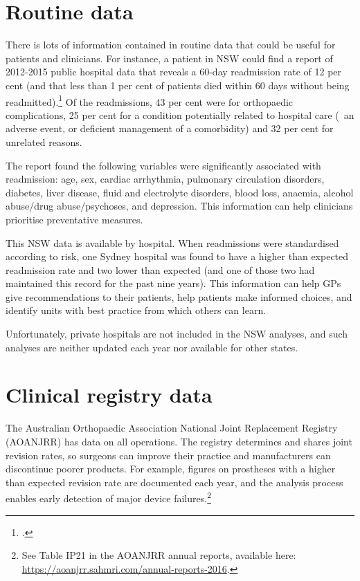 \documentclass[FrontPage]{grattan}
\begin{document}
\section{Routine data}\label{sec:routineknee}
There is lots of information contained in routine data that could be useful for patients and clinicians. For instance, a patient in NSW could find a report of 2012-2015 public hospital data that reveals a 60-day readmission rate of 12 per cent (and that less than 1 per cent of patients died within 60 days without being readmitted).\footcite[][51]{BHI2017varyread}
Of the readmissions, 43 per cent were for orthopaedic complications, 25 per cent for a condition potentially related to hospital care (\eg~an adverse event, or deficient management of a comorbidity) and 32 per cent for unrelated reasons.

The report found the following variables were significantly associated with readmission: age, sex, cardiac arrhythmia, pulmonary circulation disorders, diabetes, liver disease, fluid and electrolyte disorders, blood loss, anaemia, alcohol abuse/drug abuse/psychoses, and depression. This information can help clinicians prioritise preventative measures.

This NSW data is available by hospital. When readmissions were standardised according to risk, one Sydney hospital was found to have a higher than expected readmission rate and two lower than expected (and one of those two had maintained this record for the past nine years). This information can help GPs give recommendations to their patients, help patients make informed choices, and identify units with best practice from which others can learn.

Unfortunately, private hospitals are not included in the NSW analyses, and such analyses are neither updated each year nor available for other states.

\section{Clinical registry data}
The Australian Orthopaedic Association National Joint Replacement Registry (AOANJRR) has data on all operations. The registry determines and shares joint revision rates, so surgeons can improve their practice and manufacturers can discontinue poorer products. For example, figures on prostheses with a higher than expected revision rate are documented each year, and the analysis process enables early detection of major device failures.\footnote{See Table IP21 in the AOANJRR annual reports, available here: \textcolor{blue}{\url{https://aoanjrr.sahmri.com/annual-reports-2016}}.}
\end{document}

